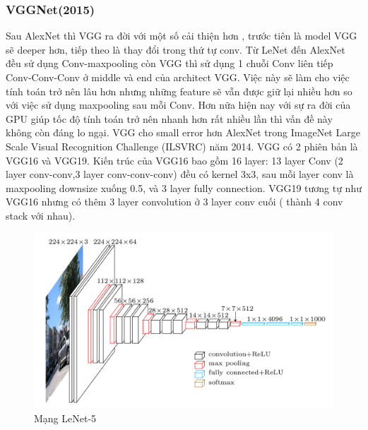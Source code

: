 \subsubsection{VGGNet(2015)}
\label{sec:vgg16}
Sau AlexNet thì VGG ra đời với một số cải thiện hơn , trước tiên là model VGG sẽ deeper hơn, tiếp theo là thay đổi trong thứ tự conv. Từ LeNet đến AlexNet đều sử dụng Conv-maxpooling còn VGG thì sử dụng 1 chuỗi Conv liên tiếp Conv-Conv-Conv ở middle và end của architect VGG. Việc này sẽ làm cho việc tính toán trở nên lâu hơn nhưng những feature sẽ vẫn được giữ lại nhiều hơn so với việc sử dụng maxpooling sau mỗi Conv. Hơn nữa hiện nay với sự ra đời của GPU giúp tốc độ tính toán trở nên nhanh hơn rất nhiều lần thì vấn đề này không còn đáng lo ngại. VGG cho small error hơn AlexNet trong ImageNet Large Scale Visual Recognition Challenge (ILSVRC) năm 2014. VGG có 2 phiên bản là VGG16 và VGG19. Kiến trúc của VGG16 bao gồm 16 layer: 13 layer Conv (2 layer conv-conv,3 layer conv-conv-conv) đều có kernel 3x3, sau mỗi layer conv là maxpooling downsize xuống 0.5, và 3 layer fully connection. VGG19 tương tự như VGG16 nhưng có thêm 3 layer convolution ở 3 layer conv cuối ( thành 4 conv stack với nhau).
\begin{figure}[H]
	\begin{center}
		\includegraphics[scale=0.4]{chap3/image/cnn/vgg16.png}
	\end{center}
	\caption{Mạng LeNet-5}
	\label{fig:CNN}
\end{figure}